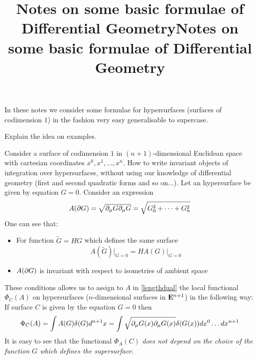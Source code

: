 \documentclass[12pt]{article}
\title{Notes on some basic formulae of Differential Geometry}
\theoremstyle{theorem}
\begin{document}
\title{Notes on some basic formulae of Differential Geometry}



\tableofcontents

 \section {}

  In these notes we consider some formulae for hypersurfaces (surfaces of codimension $1$)
   in the fashion very easy generalisable to supercase.

Explain the idea on examples.

 Consider a surface of codimension $1$ in $(n+1)$-dimensional Euclidean space
  with cartesian coordinates $x^0,x^1,\dots, x^n$.
 How to write invariant objects of integration over
 hypersurfaces, without using our knowledge of differential
 geometry (first and second quadratic forms and so on...).
  Let an hypersurface be given by equation $G=0$.
 Consider an expression
  \begin{equation}\label{lengthdual}
     A(\partial G)=\sqrt{\partial_\mu G\partial_\mu G}=\sqrt{G_0^2+\dots+G_n^2}
\end{equation}
   One can see that:
\begin {itemize}

  \item  For function $\tilde G=HG$ which defines the same surface
     \begin{equation}\label{idealdensity1}
  A(\tilde G)\vert_{G=0}=HA(G)\vert_{G=0}
     \end{equation}
  \item $A(\partial G)$ is invariant with respect to isometries of ambient space
\begin{equation}\label{idealdensity2}
\end{equation}

\end {itemize}
  These conditions allows us to assign to $A$ in \eqref{lengthdual}
    the local functional $\Phi_C(A)$ on hypersurfaces ($n$-dimensional surfaces in ${\bf E}^{n+1}$)
   in the following way: If surface $C$ is given by the equation
   $G=0$ then
   \begin{equation}\label{integralofdualdensity}
   \Phi_C(A)=\int A(G)\delta(G)d^{n+1}x=\int \sqrt{\partial_\mu G(x)\partial_\mu G(x)}\delta(G(x))
   dx^0\dots  dx^{n+1}
     \end{equation}
 It is easy to see that the functional $\Phi_A(C)$ {\it does not depend on the choice of the
 function $G$ which defines the supersurface}:
\end{document}
